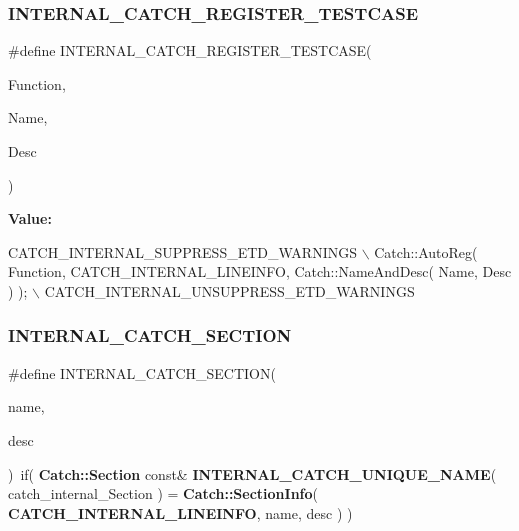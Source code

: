 \subsubsection{I\+N\+T\+E\+R\+N\+A\+L\+\_\+\+C\+A\+T\+C\+H\+\_\+\+R\+E\+G\+I\+S\+T\+E\+R\+\_\+\+T\+E\+S\+T\+C\+A\+SE}
{\footnotesize\ttfamily \#define I\+N\+T\+E\+R\+N\+A\+L\+\_\+\+C\+A\+T\+C\+H\+\_\+\+R\+E\+G\+I\+S\+T\+E\+R\+\_\+\+T\+E\+S\+T\+C\+A\+SE(\begin{DoxyParamCaption}\item[{}]{Function,  }\item[{}]{Name,  }\item[{}]{Desc }\end{DoxyParamCaption})}

{\bfseries Value\+:}
\begin{DoxyCode}
CATCH\_INTERNAL\_SUPPRESS\_ETD\_WARNINGS \(\backslash\)
        Catch::AutoReg( Function, CATCH_INTERNAL_LINEINFO, Catch::NameAndDesc( Name, Desc ) ); \(\backslash\)
        CATCH\_INTERNAL\_UNSUPPRESS\_ETD\_WARNINGS
\end{DoxyCode}
\mbox{\label{catch_8hpp_a24b4f679939a83cbda4a5c92557d77fa}} 
\subsubsection{I\+N\+T\+E\+R\+N\+A\+L\+\_\+\+C\+A\+T\+C\+H\+\_\+\+S\+E\+C\+T\+I\+ON}
{\footnotesize\ttfamily \#define I\+N\+T\+E\+R\+N\+A\+L\+\_\+\+C\+A\+T\+C\+H\+\_\+\+S\+E\+C\+T\+I\+ON(\begin{DoxyParamCaption}\item[{}]{name,  }\item[{}]{desc }\end{DoxyParamCaption})~if( \textbf{ Catch\+::\+Section} const\& \textbf{ I\+N\+T\+E\+R\+N\+A\+L\+\_\+\+C\+A\+T\+C\+H\+\_\+\+U\+N\+I\+Q\+U\+E\+\_\+\+N\+A\+ME}( catch\+\_\+internal\+\_\+\+Section ) = \textbf{ Catch\+::\+Section\+Info}( \textbf{ C\+A\+T\+C\+H\+\_\+\+I\+N\+T\+E\+R\+N\+A\+L\+\_\+\+L\+I\+N\+E\+I\+N\+FO}, name, desc ) )}

\mbox{\label{catch_8hpp_ae5403b344db1b68faf372ad1dbcb5791}} 
